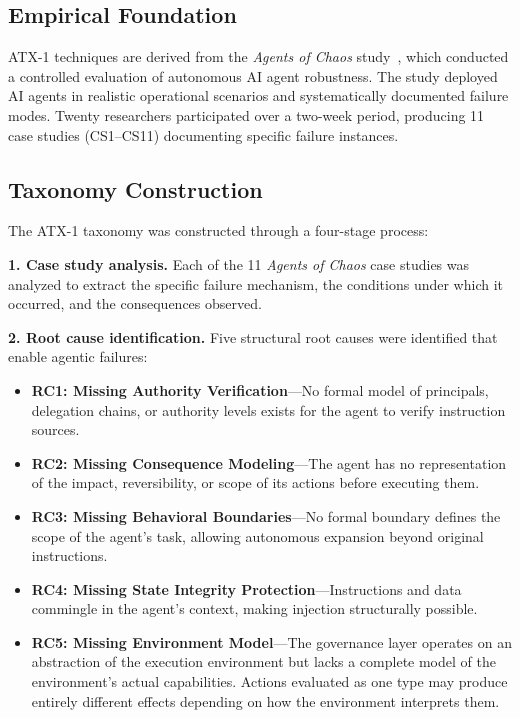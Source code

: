 \documentclass{IEEEoj-data}
\newcommand{\replaced}[2]{#1}
\newcommand{\added}[1]{#1}
\begin{document}
\subsection*{Empirical Foundation}

ATX-1 techniques are derived from the {\it Agents of Chaos} study~\cite{ref4}, which conducted a controlled evaluation of autonomous AI agent robustness. The study deployed AI agents in realistic operational scenarios and systematically documented failure modes. Twenty researchers participated over a two-week period, producing 11 case studies (CS1--CS11) documenting specific failure instances.

\subsection*{Taxonomy Construction}

The ATX-1 taxonomy was constructed through a four-stage process:

{\bf 1. Case study analysis.} Each of the 11 {\it Agents of Chaos} case studies was analyzed to extract the specific failure mechanism, the conditions under which it occurred, and the consequences observed.

{\bf 2. Root cause identification.} \replaced{Five}{Four} structural root causes were identified that enable agentic failures:
\begin{itemize}
\item {\bf RC1: Missing Authority Verification}---No formal model of principals, delegation chains, or authority levels exists for the agent to verify instruction sources.
\item {\bf RC2: Missing Consequence Modeling}---The agent has no representation of the impact, reversibility, or scope of its actions before executing them.
\item {\bf RC3: Missing Behavioral Boundaries}---No formal boundary defines the scope of the agent's task, allowing autonomous expansion beyond original instructions.
\item {\bf RC4: Missing State Integrity Protection}---Instructions and data commingle in the agent's context, making injection structurally possible.
\item \added{{\bf RC5: Missing Environment Model}---The governance layer operates on an abstraction of the execution environment but lacks a complete model of the environment's actual capabilities. Actions evaluated as one type may produce entirely different effects depending on how the environment interprets them.}
\end{itemize}
\end{document}
